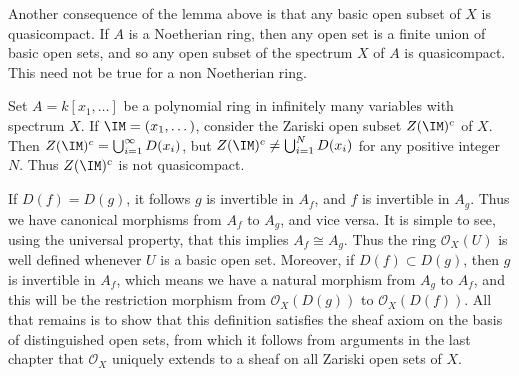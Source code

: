 Another consequence of the lemma above is that any basic open subset of $X$ is quasicompact. If $A$ is a Noetherian ring, then any open set is a finite union of basic open sets, and so any open subset of the spectrum $X$ of $A$ is quasicompact. This need not be true for a non Noetherian ring.

\begin{example}
    Set $A = k[x_1,\dots]$ be a polynomial ring in infinitely many variables with spectrum $X$. If $\IM = (x_1,\dots)$, consider the Zariski open subset $Z(\IM)^c$ of $X$. Then $Z(\IM)^c = \bigcup_{i = 1}^\infty D(x_i)$, but $Z(\IM)^c \neq \bigcup_{i = 1}^N D(x_i)$ for any positive integer $N$. Thus $Z(\IM)^c$ is not quasicompact.
\end{example}

If $D(f) = D(g)$, it follows $g$ is invertible in $A_f$, and $f$ is invertible in $A_g$. Thus we have canonical morphisms from $A_f$ to $A_g$, and vice versa. It is simple to see, using the universal property, that this implies $A_f \cong A_g$. Thus the ring $\mathcal{O}_X(U)$ is well defined whenever $U$ is a basic open set. Moreover, if $D(f) \subset D(g)$, then $g$ is invertible in $A_f$, which means we have a natural morphism from $A_g$ to $A_f$, and this will be the restriction morphism from $\mathcal{O}_X(D(g))$ to $\mathcal{O}_X(D(f))$. All that remains is to show that this definition satisfies the sheaf axiom on the basis of distinguished open sets, from which it follows from arguments in the last chapter that $\mathcal{O}_X$ uniquely extends to a sheaf on all Zariski open sets of $X$.

